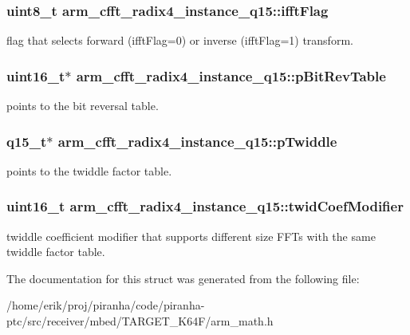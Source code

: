\subsubsection[{\texorpdfstring{ifft\+Flag}{ifftFlag}}]{\setlength{\rightskip}{0pt plus 5cm}uint8\+\_\+t arm\+\_\+cfft\+\_\+radix4\+\_\+instance\+\_\+q15\+::ifft\+Flag}\hypertarget{structarm__cfft__radix4__instance__q15_a2ecff6ea735cb4d22e922d0fd5736655}{}\label{structarm__cfft__radix4__instance__q15_a2ecff6ea735cb4d22e922d0fd5736655}
flag that selects forward (ifft\+Flag=0) or inverse (ifft\+Flag=1) transform. 
\subsubsection[{\texorpdfstring{p\+Bit\+Rev\+Table}{pBitRevTable}}]{\setlength{\rightskip}{0pt plus 5cm}uint16\+\_\+t$\ast$ arm\+\_\+cfft\+\_\+radix4\+\_\+instance\+\_\+q15\+::p\+Bit\+Rev\+Table}\hypertarget{structarm__cfft__radix4__instance__q15_a4acf704ae0cf30b53bf0fbfae8e34a59}{}\label{structarm__cfft__radix4__instance__q15_a4acf704ae0cf30b53bf0fbfae8e34a59}
points to the bit reversal table. 
\subsubsection[{\texorpdfstring{p\+Twiddle}{pTwiddle}}]{\setlength{\rightskip}{0pt plus 5cm}q15\+\_\+t$\ast$ arm\+\_\+cfft\+\_\+radix4\+\_\+instance\+\_\+q15\+::p\+Twiddle}\hypertarget{structarm__cfft__radix4__instance__q15_a29dd693537e45421a36891f8439e1fba}{}\label{structarm__cfft__radix4__instance__q15_a29dd693537e45421a36891f8439e1fba}
points to the twiddle factor table. 
\subsubsection[{\texorpdfstring{twid\+Coef\+Modifier}{twidCoefModifier}}]{\setlength{\rightskip}{0pt plus 5cm}uint16\+\_\+t arm\+\_\+cfft\+\_\+radix4\+\_\+instance\+\_\+q15\+::twid\+Coef\+Modifier}\hypertarget{structarm__cfft__radix4__instance__q15_af32fdc78bcc27ca385f9b76a0a1f71c3}{}\label{structarm__cfft__radix4__instance__q15_af32fdc78bcc27ca385f9b76a0a1f71c3}
twiddle coefficient modifier that supports different size F\+F\+Ts with the same twiddle factor table. 

The documentation for this struct was generated from the following file\+:\begin{DoxyCompactItemize}
\item 
/home/erik/proj/piranha/code/piranha-\/ptc/src/receiver/mbed/\+T\+A\+R\+G\+E\+T\+\_\+\+K64\+F/arm\+\_\+math.\+h\end{DoxyCompactItemize}
